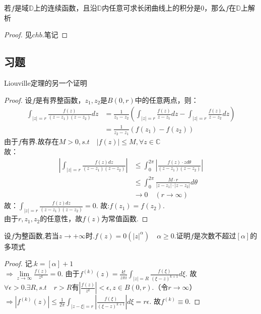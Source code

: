 \begin{mypro}[Morera]
	若$f$是域$\mathbb{D}$上的连续函数，且沿$\mathbb{D}$内任意可求长闭曲线上的积分是0，那么$f$在$\mathbb{D}$上解析
\end{mypro}
\begin{proof}
	见$chb.$笔记
\end{proof}

\subsection*{习题}
\begin{eg}
	{\rm Liouville}定理的另一个证明
\end{eg}
\begin{proof}
	设$f$是有界整函数，$z_{1},z_{2}$是$B(0,r)$中的任意两点，则：
	\begin{align*}
	\int_{|z|=r}\frac{f(z)}{(z-z_1)(z-z_2)}dz
	&=\frac{1}{z_1-z_2}
	\left(\int_{|z|=r}\frac{f(z)}{z-z_1}dz-\int_{|z|=r}\frac{f(z)}{z-z_2}dz\right)\\
	&=\frac{1}{z_2-z_1}\left(f(z_1)-f(z_2)\right)
	\end{align*}
	由于$f$有界.故存在$M>0,s.t\quad|f(z)|\leq M,\forall z\in \mathbb{C}$\\
	故：
	\begin{align*}
	\left|\int_{|z|=r}\frac{f(z)dz}{(z-z_1)(z-z_2)}\right|
	&\leq\int_0^{2\pi}\left|\frac{f(z)\cdot zd\theta}{(z-z_1)(z-z_2)}\right|\\
	&\leq\int_0^{2\pi}\frac{M\cdot r}{|z-z_1|\cdot|z-z_2|}d\theta\\
	&\rightarrow 0\quad(r\rightarrow\infty)
	\end{align*}
	故：$\displaystyle{\int_{|z|=r}\frac{f(z)dz}{(z-z_1)(z-z_2)}=0}$. \quad 故:$\displaystyle{f(z_1)=f(z_2)}$.\\
	由于$r,z_1,z_2$的任意性，故$f(z)$为常值函数.
\end{proof}

\begin{eg}
	设$f$为整函数,若当$z\rightarrow+\infty$时.$f(z)=0(|z|^\alpha)\quad\alpha\geq0$.证明$f$是次数不超过$[\alpha]$的多项式
\end{eg}
\begin{proof}
	记.$k=[\alpha]+1$\\
	$\displaystyle{\Rightarrow\lim\limits_{z\to\infty}\frac{f(z)}{z^k}=0}$.
	由于$\displaystyle{f^{(k)}(z)=\frac{k!}{z\pi i}\int_{|z|=R}\frac{f(\xi)}{(\xi-z)^{k+1}}d\xi}$.
	故$\forall\epsilon>0.\exists R, s.t\quad r>R$有$\displaystyle{\left|\frac{f(z)}{z^k}\right|<\epsilon,z\in B(0,r)}$.（令$r\rightarrow\infty$）\\
	$\displaystyle{\Rightarrow\left|f^{(k)}(z)\right|\leq\frac{1}{2\pi}\int_{|z-\xi|=r}\left|\frac{f(\xi)}{(\xi-z)^{k+1}}\right|d\xi=r\epsilon}$.
	故$f^{(k)}\equiv0$.
\end{proof}

